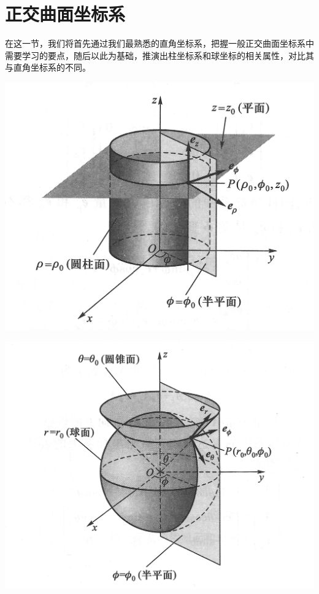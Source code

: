 \section{正交曲面坐标系}
在这一节，我们将首先通过我们最熟悉的直角坐标系，把握一般正交曲面坐标系中需要学习的要点，随后以此为基础，推演出柱坐标系和球坐标的相关属性，对比其与直角坐标系的不同。

\begin{Figure}[正交曲面坐标系]
    \begin{FigureSub}[柱坐标系]
        \includegraphics{image/1.jpg}
    \end{FigureSub}
    \begin{FigureSub}[球坐标系]
        \includegraphics{image/2.jpg}
    \end{FigureSub}
\end{Figure}

